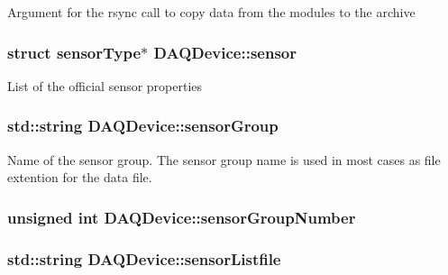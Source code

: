 Argument for the rsync call to copy data from the modules to the archive \hypertarget{classDAQDevice_a62c5391079563bbd24ac2f7cdd210710}{
\subsubsection[{sensor}]{\setlength{\rightskip}{0pt plus 5cm}struct {\bf sensor\-Type}$\ast$ D\-A\-Q\-Device\-::sensor\hspace{0.3cm}{\ttfamily [protected]}}}\label{classDAQDevice_a62c5391079563bbd24ac2f7cdd210710}
List of the official sensor properties \hypertarget{classDAQDevice_a63a6793abe5933e7dc71cd673bd0f98f}{
\subsubsection[{sensor\-Group}]{\setlength{\rightskip}{0pt plus 5cm}std\-::string D\-A\-Q\-Device\-::sensor\-Group\hspace{0.3cm}{\ttfamily [protected]}}}\label{classDAQDevice_a63a6793abe5933e7dc71cd673bd0f98f}
Name of the sensor group. The sensor group name is used in most cases as file extention for the data file. \hypertarget{classDAQDevice_aa35abc3d365a36659b64df6cadf2c807}{
\subsubsection[{sensor\-Group\-Number}]{\setlength{\rightskip}{0pt plus 5cm}unsigned int D\-A\-Q\-Device\-::sensor\-Group\-Number\hspace{0.3cm}{\ttfamily [protected]}}}\label{classDAQDevice_aa35abc3d365a36659b64df6cadf2c807}
\hypertarget{classDAQDevice_aab515711e872a4ee38ae5b1278f64286}{
\subsubsection[{sensor\-Listfile}]{\setlength{\rightskip}{0pt plus 5cm}std\-::string D\-A\-Q\-Device\-::sensor\-Listfile}}\label{classDAQDevice_aab515711e872a4ee38ae5b1278f64286}
